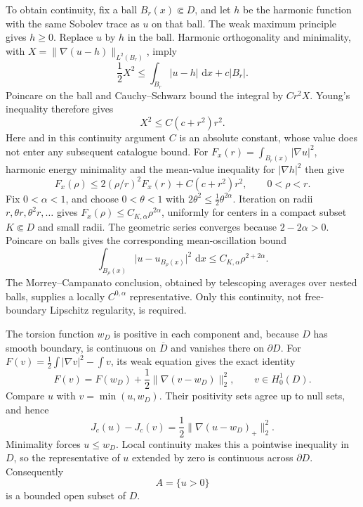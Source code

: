 \documentclass[11pt,reqno]{amsart}
\numberwithin{equation}{section}
\newcommand{\dd}{\,\mathrm d}
\newcommand{\abs}[1]{\lvert#1\rvert}
\newcommand{\norm}[1]{\lVert#1\rVert}
\begin{document}
To obtain continuity, fix a ball \(B_r(x)\Subset D\), and let \(h\)
be the harmonic function with the same Sobolev trace as \(u\) on
that ball.  The weak maximum principle gives \(h\ge0\).  Replace \(u\)
by \(h\) in the ball.  Harmonic orthogonality and minimality, with
\(X=\norm{\nabla(u-h)}_{L^2(B_r)}\), imply
\[
 \frac12X^2
 \le \int_{B_r}\abs{u-h}\,\dd x+c\abs{B_r}.
\]
Poincare on the ball and Cauchy--Schwarz bound the integral by
\(C r^2X\).  Young's inequality therefore gives
\begin{equation}
 X^2\le C(c+r^2)r^2.
 \label{surgery:harmonic-replacement}
\end{equation}
Here and in this continuity argument \(C\) is an absolute constant,
whose value does not enter any subsequent catalogue bound.
For \(F_x(r)=\int_{B_r(x)}\abs{\nabla u}^2\), harmonic energy
minimality and the mean-value inequality for \(\abs{\nabla h}^2\)
then give
\[
 F_x(\rho)\le 2(\rho/r)^2F_x(r)+C(c+r^2)r^2,
 \qquad 0<\rho<r.
\]
Fix \(0<\alpha<1\), and choose \(0<\theta<1\) with
\(2\theta^2\le\frac12\theta^{2\alpha}\).
Iteration on radii \(r,\theta r,\theta^2r,\ldots\) gives
\(F_x(\rho)\le C_{K,\alpha}\rho^{2\alpha}\), uniformly for centers
in a compact subset \(K\Subset D\) and small radii.  The geometric
series converges because \(2-2\alpha>0\).  Poincare on balls gives
the corresponding mean-oscillation bound
\[
 \int_{B_\rho(x)}
       \abs{u-u_{B_\rho(x)}}^2\,\dd x
       \le C_{K,\alpha}\rho^{2+2\alpha}.
\]
The Morrey--Campanato conclusion, obtained by telescoping averages
over nested balls, supplies a locally \(C^{0,\alpha}\)
representative.  Only this continuity, not free-boundary
Lipschitz regularity, is required.

The torsion function \(w_D\) is positive in each component and,
because \(D\) has smooth boundary, is continuous on \(\overline D\)
and vanishes there on \(\partial D\).  For
\(F(v)=\frac12\int\abs{\nabla v}^2-\int v\), its weak equation gives
the exact identity
\[
 F(v)=F(w_D)+\frac12\norm{\nabla(v-w_D)}_2^2,
 \qquad v\in H^1_0(D).
\]
Compare \(u\) with \(v=\min(u,w_D)\).  Their positivity sets agree
up to null sets, and hence
\[
 J_c(u)-J_c(v)
 =\frac12\norm{\nabla(u-w_D)_+}_2^2.
\]
Minimality forces \(u\le w_D\).  Local continuity makes this a
pointwise inequality in \(D\), so the representative of \(u\)
extended by zero is continuous across \(\partial D\).  Consequently
\[
 A=\{u>0\}
\]
is a bounded open subset of \(D\).
\end{document}

